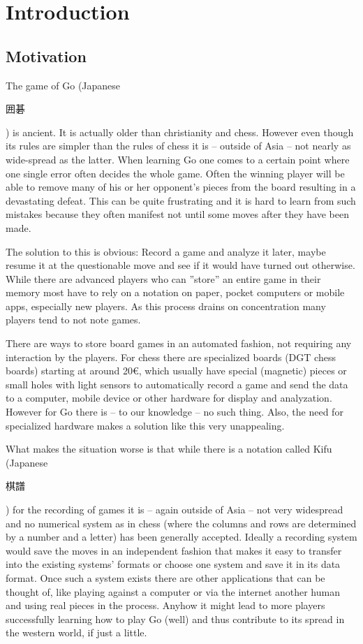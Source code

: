 
\chapter{Introduction}
	\section{Motivation}
	The game of Go (Japanese \begingroup\setmainfont{Droid Sans Japanese}\small\begin{CJK}{UTF8}{min}囲碁\end{CJK}\endgroup ) is ancient. It is actually older than christianity and chess. However even though its rules are simpler than the rules of chess it is -- outside of Asia -- not nearly as wide-spread as the latter. When learning Go one comes to a certain point where one single error often decides the whole game. Often the winning player will be able to remove many of his or her opponent's pieces from the board resulting in a devastating defeat. This can be quite frustrating and it is hard to learn from such mistakes because they often manifest not until some moves after they have been made.

	The solution to this is obvious: Record a game and analyze it later, maybe resume it at the questionable move and see if it would have turned out otherwise. While there are advanced players who can ''store'' an entire game in their memory most have to rely on a notation on paper, pocket computers or mobile apps, especially new players. As this process drains on concentration many players tend to not note games.

	There are ways to store board games in an automated fashion, not requiring any interaction by the players. For chess there are specialized boards (DGT chess boards) starting at around 20€, which usually have special (magnetic) pieces\cite{bulsink2001device} or small holes with light sensors to automatically record a game and send the data to a computer, mobile	device or other hardware for display and analyzation. However for Go there is -- to our knowledge -- no such thing. Also, the need for specialized hardware makes a solution like this very unappealing.

	What makes the situation worse is that while there is a notation called Kifu (Japanese \begingroup\setmainfont{Droid Sans Japanese}\small\begin{CJK}{UTF8}{min}棋譜\end{CJK}\endgroup ) for the recording of games it is -- again outside of Asia -- not very widespread and no numerical system as in chess (where the columns and rows are determined by a number and a letter) has been generally accepted. Ideally a recording system would save the moves in an independent fashion that makes it easy to transfer into the existing systems' formats or choose one system and save it in its data format. Once such a system exists there are other applications that can be thought of, like playing against a computer or via the internet another human and using real pieces in the process. Anyhow it might lead to more players successfully learning how to play Go (well) and thus contribute to its spread in the western world, if just a little. %

